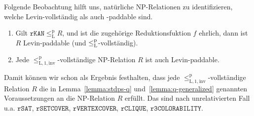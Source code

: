 Folgende Beobachtung hilft uns, natürliche NP-Relationen zu identifizieren, welche Levin-vollständig als auch -paddable sind.

\begin{observation}\label{obs:invcomplete-sind-levinpaddable}
    \begin{enumerate}
        \item Gilt $\mathtt{rKAN}\leq_\mathrm{L}^\mathrm{p} R$, und ist die zugehörige Reduktionsfuktion $f$ ehrlich, dann ist $R$ Levin-paddable (und $\leq_\mathrm{L}^\mathrm{p}$-vollständig).
        \item Jede $\leq_\mathrm{L,1,inv}^\mathrm{p}$-vollständige NP-Relation $R$ ist auch Levin-paddable.
    \end{enumerate}
\end{observation}
Damit können wir schon als Ergebnis festhalten, dass 
jede $\leq_\mathrm{L,1,inv}^\mathrm{p}$-vollständige Relation $R$ die in 
Lemma~\ref{lemma:stdps-q} und~\ref{lemma:q-generalized} genannten Voraussetzungen an die NP-Relation $R$ erfüllt.
Das sind nach \textcite{goldreich_computational_2008} unrelativierten Fall u.a. $\mathtt{rSAT}$, $\mathtt{rSETCOVER}$, $\mathtt{rVERTEXCOVER}$, $\mathtt{rCLIQUE}$, $\mathtt{r3COLORABILITY}$.

